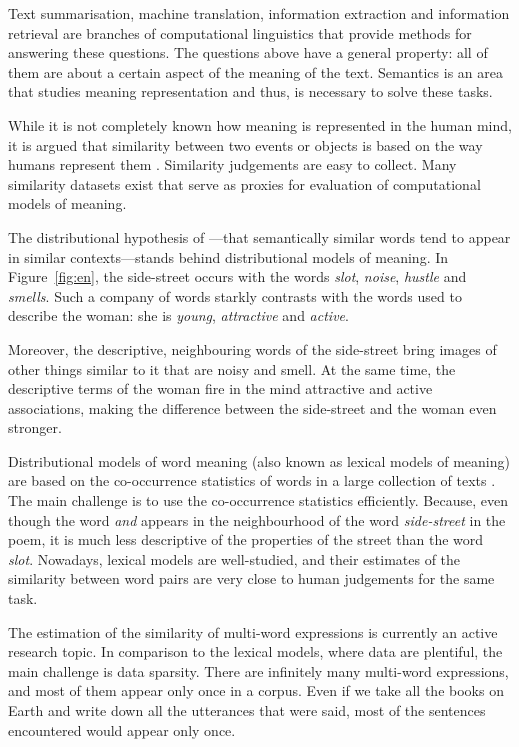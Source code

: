 Text summarisation, machine translation, information extraction and information retrieval are branches of computational linguistics that provide methods for answering these questions. The questions above have a general property: all of them are about a certain aspect of the meaning of the text. Semantics is an area that studies meaning representation and thus, is necessary to solve these tasks.

While it is not completely known how meaning is represented in the human mind, it is argued that similarity between two events or objects is based on the way humans represent them \cite{WCS:WCS1282}. Similarity judgements are easy to collect. Many similarity datasets exist that serve as proxies for evaluation of computational models of meaning.

The distributional hypothesis of \citet{harris1954distributional}---that semantically similar words tend to appear in similar contexts---stands behind distributional models of meaning. In Figure~\ref{fig:en}, the side-street occurs with the words \textit{slot}, \textit{noise}, \textit{hustle} and \textit{smells}. Such a company of words starkly contrasts with the words used to describe the woman: she is \textit{young}, \textit{attractive} and \textit{active}.

Moreover, the descriptive, neighbouring words of the side-street bring images of other things similar to it that are noisy and smell. At the same time, the descriptive terms of the woman fire in the mind attractive and active associations, making the difference between the side-street and the woman even stronger.

Distributional models of word meaning (also known as lexical models of meaning) are based on the co-occurrence statistics of words in a large collection of texts \cite{Turney:2010:FMV:1861751.1861756,mikolov2013linguistic,mikolov2013distributed,mikolov2013efficient}. The main challenge is to use the co-occurrence statistics efficiently. Because, even though the word \textit{and} appears in the neighbourhood of the word \textit{side-street} in the poem, it is much less descriptive of the properties of the street than the word \textit{slot}. Nowadays, lexical models are well-studied, and their estimates of the similarity between word pairs are very close to human judgements  for the same task\cite{TACL570,baroni-dinu-kruszewski:2014:P14-1,Halawi:2012:LLW:2339530.2339751}.

The estimation of the similarity of multi-word expressions is currently an active research topic. In comparison to the lexical models, where data are plentiful, the main challenge is data sparsity. There are infinitely many multi-word expressions, and most of them appear only once in a corpus. Even if we take all the books on Earth and write down all the utterances that were said, most of the sentences encountered would appear only once.

